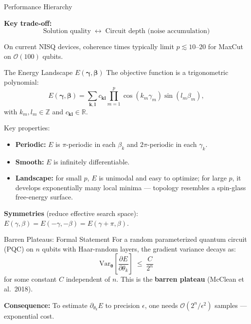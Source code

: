 \documentclass{beamer}
\begin{document}
\begin{frame}
\begin{frame}{Performance Hierarchy}
\medskip

\textbf{Key trade-off:}
\[
\text{Solution quality} \;\;\longleftrightarrow\;\;
\text{Circuit depth (noise accumulation)}
\]

On current NISQ devices, coherence times typically limit $p \lesssim
10$--$20$ for MaxCut on $\mathcal{O}(100)$ qubits.
\end{frame}


\begin{frame}{The Energy Landscape $E(\boldsymbol{\gamma},\boldsymbol{\beta})$}
The objective function is a trigonometric polynomial:
\[
E(\boldsymbol{\gamma},\boldsymbol{\beta})
= \sum_{\mathbf{k},\mathbf{l}} c_{\mathbf{k}\mathbf{l}}
\prod_{m=1}^p \cos(k_m\gamma_m)\sin(l_m\beta_m),
\]
with $k_m,l_m\in\mathbb{Z}$ and $c_{\mathbf{kl}}\in\mathbb{R}$.

Key properties:
\begin{itemize}
\item \textbf{Periodic:} $E$ is $\pi$-periodic in each $\beta_k$ and
  $2\pi$-periodic in each $\gamma_k$.
\item \textbf{Smooth:} $E$ is infinitely differentiable.
\item \textbf{Landscape:} for small $p$, $E$ is unimodal and easy to
  optimize; for large $p$, it develops exponentially many local minima
  --- topology resembles a spin-glass free-energy surface.
\end{itemize}

\textbf{Symmetries} (reduce effective search space):
$E(\gamma,\beta) = E(-\gamma,-\beta) = E(\gamma+\pi,\beta)$.
\end{frame}


\begin{frame}{Barren Plateaus: Formal Statement}
For a random parameterized quantum circuit (PQC) on $n$ qubits with
Haar-random layers, the gradient variance decays as:
\[
\mathrm{Var}_{\boldsymbol{\theta}}\!\left[
\frac{\partial E}{\partial\theta_k}
\right]
\;\leq\; \frac{C}{2^n}
\]
for some constant $C$ independent of $n$. This is the
\textbf{barren plateau} (McClean et al.\ 2018).

\medskip

\textbf{Consequence:}  To estimate $\partial_{\theta_k} E$ to precision
$\epsilon$, one needs $\mathcal{O}(2^n/\epsilon^2)$ samples --- exponential cost.


\end{frame}
\end{frame}
\end{document}

